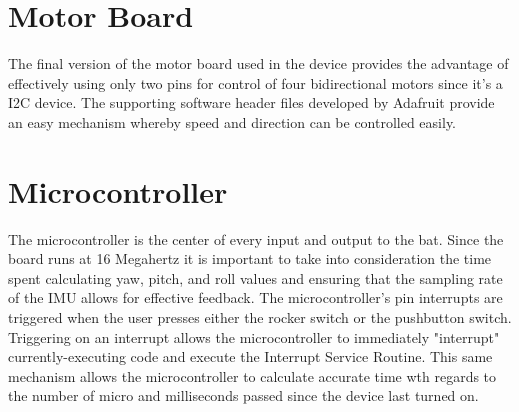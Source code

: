 \section{Motor Board}

The final version of the motor board used in the device provides the advantage of effectively using only two pins for control of four bidirectional motors since it's a I2C device.  The supporting software header files developed by Adafruit provide an easy mechanism whereby speed and direction can be controlled easily.

\section{Microcontroller}

The microcontroller is the center of every input and output to the bat.  Since the board runs at 16 Megahertz it is important to take into consideration the time spent calculating yaw, pitch, and roll values and ensuring that the sampling rate of the IMU allows for effective feedback.  The microcontroller's pin interrupts are triggered when the user presses either the rocker switch or the pushbutton switch.  Triggering on an interrupt allows the microcontroller to immediately "interrupt" currently-executing code and execute the Interrupt Service Routine.  This same mechanism allows the microcontroller to calculate accurate time wth regards to the number of micro and milliseconds passed since the device last turned on.
